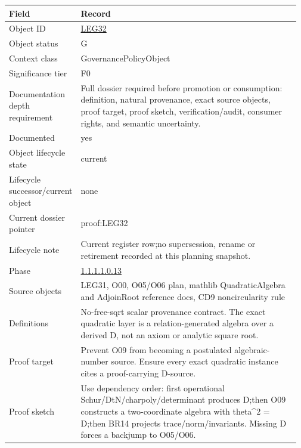 \begin{longtable}{L{0.16\linewidth} L{0.81\linewidth}}
\hline
\textbf{Field} & \textbf{Record}\\
\hline
Object ID & \hyperlink{object-row-LEG32}{LEG32}\\
\hline\addlinespace[0.20em]
Object status & G\\
\hline\addlinespace[0.20em]
Context class & GovernancePolicyObject\\
\hline\addlinespace[0.20em]
Significance tier & F0\\
\hline\addlinespace[0.20em]
Documentation depth requirement & Full dossier required before promotion or consumption: definition, natural provenance, exact source objects, proof target, proof sketch, verification/\allowbreak{}audit, consumer rights, and semantic uncertainty.\\
\hline\addlinespace[0.20em]
Documented & yes\\
\hline\addlinespace[0.20em]
Object lifecycle state & current\\
\hline\addlinespace[0.20em]
Lifecycle successor/\allowbreak{}current object & none\\
\hline\addlinespace[0.20em]
Current dossier pointer & proof:LEG32\\
\hline\addlinespace[0.20em]
Lifecycle note & Current register row;\newline no supersession, rename or retirement recorded at this planning snapshot.\\
\hline\addlinespace[0.20em]
Phase & \hyperlink{phase-row-1-1-1-1-0-13}{1.1.1.1.0.13}\\
\hline\addlinespace[0.20em]
Source objects & LEG31, O00, O05/\allowbreak{}O06 plan, mathlib QuadraticAlgebra and AdjoinRoot reference docs, CD9 noncircularity rule\\
\hline\addlinespace[0.20em]
Definitions & No-free-sqrt scalar provenance contract. The exact quadratic layer is a relation-generated algebra over a derived D, not an axiom or analytic square root.\\
\hline\addlinespace[0.20em]
Proof target & Prevent O09 from becoming a postulated algebraic-number source. Ensure every exact quadratic instance cites a proof-carrying D-source.\\
\hline\addlinespace[0.20em]
Proof sketch & Use dependency order: first operational Schur/\allowbreak{}DtN/\allowbreak{}charpoly/\allowbreak{}determinant produces D;\newline then O09 constructs a two-coordinate algebra with theta\textasciicircum{}2 = D;\newline then BR14 projects trace/\allowbreak{}norm/\allowbreak{}invariants. Missing D forces a backjump to O05/\allowbreak{}O06.\\

\end{longtable}
